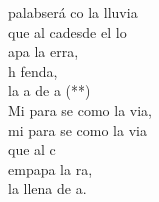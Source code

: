 \begin{cancion}[Mi Palabra][Nico]%
	 palabserá co la lluvia\\
	que al cadesde el lo\\
	apa la erra,\\
	h fenda,\\
	la a de a (**)\\
	\jump
	Mi para se como la via,\\
	mi para se como la via\\
	que al c  \\
	empapa la ra,\\
	la llena de a.\\
\end{cancion}%
